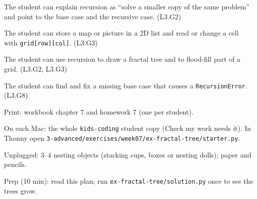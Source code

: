 
\begin{objectives}
  \item The student can explain recursion as \enquote{solve a smaller copy of the same problem} and point to the base case and the recursive case. (L3.G2)
  \item The student can store a map or picture in a 2D list and read or change a cell with \texttt{grid[row][col]}. (L3.G3)
  \item The student can use recursion to draw a fractal tree and to flood-fill part of a grid. (L3.G2, L3.G3)
  \item The student can find and fix a missing base case that causes a \texttt{RecursionError}. (L3.G8)
\end{objectives}

\begin{materials}
  \item Print: workbook chapter 7 and homework 7 (one per student).
  \item On each Mac: the whole \texttt{kids-coding} student copy (Check my work needs it). In Thonny open \texttt{3-advanced/exercises/week07/ex-fractal-tree/starter.py}.
  \item Unplugged: 3--4 nesting objects (stacking cups, boxes or nesting dolls); paper and pencils.
  \item Prep (10 min): read this plan; run \texttt{ex-fractal-tree/solution.py} once to see the trees grow.
\end{materials}

\begin{timeplan}
\end{timeplan}

